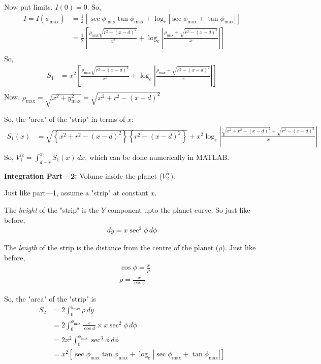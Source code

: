 \documentclass[12pt]{extarticle}
\begin{document}
Now put limits. $I(0) = 0$. So,
    \begin{align*} 
        I = I(\phi_{\max}) &= \frac{1}{2} \left[  \sec \phi_{\max} \tan \phi_{\max} + \log_e \left|\sec \phi_{\max} + \tan \phi_{\max} \right|\right] \\
        &= \frac{1}{2} \left[  \frac{\rho_{\max} \sqrt{r^2 - (x-d)^2}}{x^2} + \log_e \left| \frac{\rho_{\max} + \sqrt{r^2 - (x-d)^2}}{x} \right|\right] \\
    \end{align*}
So, 
    \begin{align*} 
         S_1 &= x^2  \left[  \frac{\rho_{\max} \sqrt{r^2 - (x-d)^2}}{x^2} + \log_e \left| \frac{\rho_{\max} + \sqrt{r^2 - (x-d)^2}}{x} \right|\right] \\
    \end{align*}
Now, $\rho_{\max} = \sqrt{x^2 + y_{\max}^2} = \sqrt{x^2 + r^2 - (x-d)^2}$

So, the "area" of the "strip" in terms of $x$:
     \begin{align*} 
         S_1(x) &=  \sqrt{\left\{x^2 + r^2 - (x-d)^2\right\}  \left\{r^2 - (x-d)^2\right\}} + x^2 \log_e \left| \frac{\sqrt{x^2 + r^2 - (x-d)^2} + \sqrt{r^2 - (x-d)^2}}{x} \right| \\
     \end{align*}
So, $V^{ic}_1 = \int_{d-r}^{x_0} S_1(x) \,dx$, which can be done numerically in MATLAB.
 

\vspace{1cm}


\textbf{Integration Part---2:} Volume inside the planet ($V^{ic}_2$):

Just like part---1, assume a "strip" at constant $x$.

The \textit{height} of the "strip" is the $Y$ component upto the planet curve. So just like before,
     \begin{align*} 
         dy = x  \sec^2 \phi \,d \phi
     \end{align*}

The \textit{length} of the strip is the distance from the centre of the planet ($\rho$). Just like before,
    \begin{align*} 
        &\cos \phi = \frac{x}{\rho} \\
        &\rho = \frac{x}{\cos \phi}
    \end{align*}

So, the "area" of the "strip" is
    \begin{align*} 
        S_2 &= 2 \int_{0}^{y_{\max}} \rho \,dy \\
        &= 2 \int_{0}^{\phi_{\max}} \frac{x}{\cos \phi} \times x \sec^2 \phi \,d\phi \\
        &= 2x^2 \int_{0}^{\phi_{\max}} \sec^3 \phi \,d\phi \\
        &= x^2 \left[  \sec \phi_{\max} \tan \phi_{\max} + \log_e \left|\sec \phi_{\max} + \tan \phi_{\max} \right|\right] \\
    \end{align*}
\end{document}
